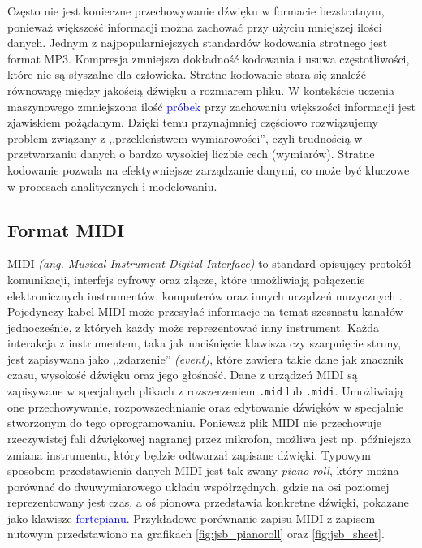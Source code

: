 \documentclass[data-science]{agh-wi} %
\begin{document}
Często nie jest konieczne przechowywanie dźwięku w formacie bezstratnym, ponieważ większość informacji można zachować przy użyciu mniejszej ilości danych. Jednym z najpopularniejszych standardów kodowania stratnego jest format MP3. Kompresja zmniejsza dokładność kodowania i usuwa częstotliwości, które nie są słyszalne dla człowieka. Stratne kodowanie stara się znaleźć równowagę między jakością dźwięku a rozmiarem pliku. W kontekście uczenia maszynowego zmniejszona ilość \textcolor{blue}{próbek} przy zachowaniu większości informacji jest zjawiskiem pożądanym. Dzięki temu przynajmniej częściowo rozwiązujemy problem związany z ,,przekleństwem wymiarowości'', czyli trudnością w przetwarzaniu danych o bardzo wysokiej liczbie cech (wymiarów). Stratne kodowanie pozwala na efektywniejsze zarządzanie danymi, co może być kluczowe w procesach analitycznych i modelowaniu.

\subsection{Format MIDI}
MIDI \textit{(ang. Musical Instrument Digital Interface)} to standard opisujący protokół komunikacji, interfejs cyfrowy oraz złącze, które umożliwiają połączenie elektronicznych instrumentów, komputerów oraz innych urządzeń muzycznych \cite{midi_specification}. Pojedynczy kabel MIDI może przesyłać informacje na temat szesnastu kanałów jednocześnie, z których każdy może reprezentować inny instrument. Każda interakcja z instrumentem, taka jak naciśnięcie klawisza czy szarpnięcie struny, jest zapisywana jako ,,zdarzenie'' \textit{(event)}, które zawiera takie dane jak znacznik czasu, wysokość dźwięku oraz jego głośność. Dane z urządzeń MIDI są zapisywane w specjalnych plikach z rozszerzeniem \texttt{.mid} lub \texttt{.midi}. Umożliwiają one przechowywanie, rozpowszechnianie oraz edytowanie dźwięków w specjalnie stworzonym do tego oprogramowaniu. Ponieważ plik MIDI nie przechowuje rzeczywistej fali dźwiękowej nagranej przez mikrofon, możliwa jest np. późniejsza zmiana instrumentu, który będzie odtwarzał zapisane dźwięki. Typowym sposobem przedstawienia danych MIDI jest tak zwany \textit{piano roll}, który można porównać do dwuwymiarowego układu współrzędnych, gdzie na osi poziomej reprezentowany jest czas, a oś pionowa przedstawia konkretne dźwięki, pokazane jako klawisze \textcolor{blue}{fortepianu}. Przykładowe porównanie zapisu MIDI z zapisem nutowym przedstawiono na grafikach \ref*{fig:jsb_pianoroll} oraz \ref*{fig:jsb_sheet}.
\end{document}
